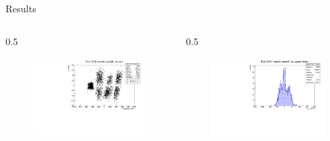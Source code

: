 \documentclass{beamer}[10pt]
\begin{document}
\begin{frame}{Results}
\begin{columns}
\begin{column}{0.5\framewidth}
      \begin{figure}[H]
        \centering
        \includegraphics[width= \textwidth]{figures/pdf/panel_00_x_bias_vs_x.pdf}
        \label{fig:enter-label}
    \end{figure}
    \end{column}
    \begin{column}{0.5\framewidth}
      \begin{figure}[H]
        \centering
        \includegraphics[width=  \textwidth]{figures/pdf/panel_00_x_bias.pdf}
        \label{fig:enter-label}
    \end{figure}
    \vspace{-12mm}


\end{column}
\end{columns}
\end{frame}
\end{document}
